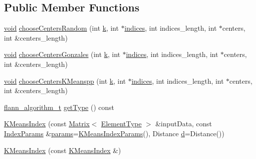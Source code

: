 \subsection*{Public Member Functions}
\begin{DoxyCompactItemize}
\item 
\hyperlink{legacy_8hpp_a8bb47f092d473522721002c86c13b94e}{void} \hyperlink{classcvflann_1_1KMeansIndex_a2dd49d64f6cdc7751990ee1f1920609e}{choose\-Centers\-Random} (int \hyperlink{legacy_8hpp_a7be9b6436e5ea72ff5d5a66779b4bd38}{k}, int $\ast$\hyperlink{legacy_8hpp_a3e3b9b48bcbc7f460efbcfe4399ad24a}{indices}, int indices\-\_\-length, int $\ast$centers, int \&centers\-\_\-length)
\item 
\hyperlink{legacy_8hpp_a8bb47f092d473522721002c86c13b94e}{void} \hyperlink{classcvflann_1_1KMeansIndex_a224fbbe5fdc60db9374ddbf499b0e9d3}{choose\-Centers\-Gonzales} (int \hyperlink{legacy_8hpp_a7be9b6436e5ea72ff5d5a66779b4bd38}{k}, int $\ast$\hyperlink{legacy_8hpp_a3e3b9b48bcbc7f460efbcfe4399ad24a}{indices}, int indices\-\_\-length, int $\ast$centers, int \&centers\-\_\-length)
\item 
\hyperlink{legacy_8hpp_a8bb47f092d473522721002c86c13b94e}{void} \hyperlink{classcvflann_1_1KMeansIndex_a02bf5e31ac3996251fea5e2de6bd3fea}{choose\-Centers\-K\-Meanspp} (int \hyperlink{legacy_8hpp_a7be9b6436e5ea72ff5d5a66779b4bd38}{k}, int $\ast$\hyperlink{legacy_8hpp_a3e3b9b48bcbc7f460efbcfe4399ad24a}{indices}, int indices\-\_\-length, int $\ast$centers, int \&centers\-\_\-length)
\item 
\hyperlink{namespacecvflann_a4e3e6c98d774ea77fd7f0045c9bc7817}{flann\-\_\-algorithm\-\_\-t} \hyperlink{classcvflann_1_1KMeansIndex_ab1d2d857e2ee7660d24e563c4c11dab1}{get\-Type} () const 
\item 
\hyperlink{classcvflann_1_1KMeansIndex_ae4bea160d9e9d70f0f8177be8e0d1f0e}{K\-Means\-Index} (const \hyperlink{classcvflann_1_1Matrix}{Matrix}$<$ \hyperlink{classcvflann_1_1KMeansIndex_a2a28d6535e3e452320f97417f6c127ef}{Element\-Type} $>$ \&input\-Data, const \hyperlink{namespacecvflann_a742b4c7076c21012054af74a9ee48289}{Index\-Params} \&\hyperlink{compat_8hpp_a0480a03ecc41b20cde376602531d9270}{params}=\hyperlink{structcvflann_1_1KMeansIndexParams}{K\-Means\-Index\-Params}(), Distance \hyperlink{legacy_8hpp_a6f364afbe132c4ecfea48bde1b0618ba}{d}=Distance())
\item 
\hyperlink{classcvflann_1_1KMeansIndex_a6099d9d9abb2414e5a772d35ca73ee0e}{K\-Means\-Index} (const \hyperlink{classcvflann_1_1KMeansIndex}{K\-Means\-Index} \&)
\item 

\end{DoxyCompactItemize}
